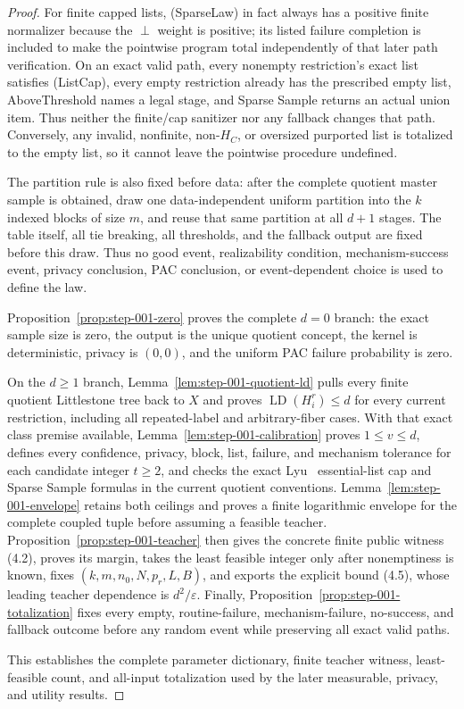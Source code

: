 \begin{proof}
For finite capped lists, (SparseLaw) in fact always has a positive finite
normalizer because the \(\perp\) weight is positive; its listed failure
completion is included to make the pointwise program total independently of
that later path verification. On an exact valid path, every nonempty
restriction's exact list satisfies (ListCap), every empty restriction already
has the prescribed empty list, AboveThreshold names a legal stage, and Sparse
Sample returns an actual union item. Thus neither the finite/cap sanitizer nor
any fallback changes that path. Conversely, any invalid, nonfinite,
non-\(H_C\), or oversized purported list is totalized to the empty list, so
it cannot leave the pointwise procedure undefined.

The partition rule is also fixed before data: after the complete quotient
master sample is obtained, draw one data-independent uniform partition into
the \(k\) indexed blocks of size \(m\), and reuse that same partition at all
\(d+1\) stages. The table itself, all tie breaking, all thresholds, and the
fallback output are fixed before this draw. Thus no good event, realizability
condition, mechanism-success event, privacy conclusion, PAC conclusion, or
event-dependent choice is used to define the law.

Proposition~\ref{prop:step-001-zero} proves the complete \(d=0\) branch:
the exact sample size is zero, the output is the unique quotient concept,
the kernel is deterministic, privacy is \((0,0)\), and the uniform PAC
failure probability is zero.

On the \(d\ge1\) branch,
Lemma~\ref{lem:step-001-quotient-ld} pulls every finite quotient
Littlestone tree back to \(X\) and proves
\(\operatorname{LD}(H_i^r)\le d\) for every current restriction, including
all repeated-label and arbitrary-fiber cases. With that exact class premise
available, Lemma~\ref{lem:step-001-calibration} proves \(1\le v\le d\),
defines every confidence, privacy, block, list, failure, and mechanism
tolerance for each candidate integer \(t\ge2\), and checks the exact Lyu~\citep{lyu2025}
essential-list cap and Sparse Sample formulas in the current quotient
conventions. Lemma~\ref{lem:step-001-envelope} retains both ceilings and
proves a finite logarithmic envelope for the complete coupled tuple before
assuming a feasible teacher. Proposition~\ref{prop:step-001-teacher} then
gives the concrete finite public witness (4.2), proves its margin, takes the
least feasible integer only after nonemptiness is known, fixes
\((k,m,n_0,N,p_r,L,B)\), and exports the explicit bound (4.5), whose leading
teacher dependence is \(d^2/\varepsilon\). Finally,
Proposition~\ref{prop:step-001-totalization} fixes every empty,
routine-failure, mechanism-failure, no-success, and fallback outcome before
any random event while preserving all exact valid paths.

This establishes the complete parameter dictionary, finite teacher witness,
least-feasible count, and all-input totalization used by the later measurable,
privacy, and utility results.



\end{proof}

